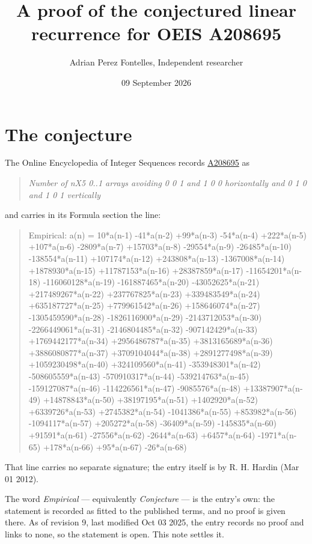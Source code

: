 \documentclass[11pt]{article}
\title{A proof of the conjectured linear recurrence for OEIS A208695}
\author{Adrian Perez Fontelles, Independent researcher}
\date{09 September 2026}
\theoremstyle{definition}
\begin{document}
\maketitle
\section{The conjecture}

The Online Encyclopedia of Integer Sequences records \href{https://oeis.org/A208695}{A208695} as

\begin{quote}\itshape Number of nX5 0..1 arrays avoiding 0 0 1 and 1 0 0 horizontally and 0 1 0 and 1 0 1 vertically\end{quote}

and carries in its Formula section the line:

\begin{quote}\ttfamily Empirical: a(n) = 10*a(n-1) -41*a(n-2) +99*a(n-3) -54*a(n-4) +222*a(n-5) +107*a(n-6) -2809*a(n-7) +15703*a(n-8) -29554*a(n-9) -26485*a(n-10) -138554*a(n-11) +107174*a(n-12) +243808*a(n-13) -1367008*a(n-14) +1878930*a(n-15) +11787153*a(n-16) +28387859*a(n-17) -11654201*a(n-18) -116060128*a(n-19) -161887465*a(n-20) -43052625*a(n-21) +217489267*a(n-22) +237767825*a(n-23) +339483549*a(n-24) +635187727*a(n-25) +779961542*a(n-26) +158646074*a(n-27) -1305459590*a(n-28) -1826116900*a(n-29) -2143712053*a(n-30) -2266449061*a(n-31) -2146804485*a(n-32) -907142429*a(n-33) +1769442177*a(n-34) +2956486787*a(n-35) +3813165689*a(n-36) +3886080877*a(n-37) +3709104044*a(n-38) +2891277498*a(n-39) +1059230498*a(n-40) +324109560*a(n-41) -353948301*a(n-42) -508605559*a(n-43) -570910317*a(n-44) -539214763*a(n-45) -159127087*a(n-46) -114226561*a(n-47) -9085576*a(n-48) +13387907*a(n-49) +14878843*a(n-50) +38197195*a(n-51) +1402920*a(n-52) +6339726*a(n-53) +2745382*a(n-54) -1041386*a(n-55) +853982*a(n-56) -1094117*a(n-57) +205272*a(n-58) -36409*a(n-59) -145835*a(n-60) +91591*a(n-61) -27556*a(n-62) -2644*a(n-63) +6457*a(n-64) -1971*a(n-65) +178*a(n-66) +95*a(n-67) -26*a(n-68)\end{quote}

That line carries no separate signature; the entry itself is by R. H. Hardin (Mar 01 2012).

The word {\itshape Empirical} --- equivalently {\itshape Conjecture} --- is the entry's own: the statement is recorded as fitted to the published terms, and no proof is given there. As of revision 9, last modified Oct 03 2025, the entry records no proof and links to none, so the statement is open. This note settles it.
\end{document}
